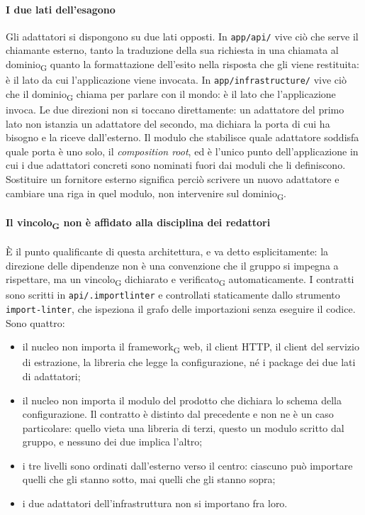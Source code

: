 \documentclass[a4paper, 10pt]{article}
\begin{document}
\paragraph{I due lati dell'esagono}
Gli adattatori si dispongono su due lati opposti. In \texttt{app/api/} vive ciò che serve il chiamante esterno, tanto la traduzione della sua richiesta in una chiamata al dominio\textsubscript{G} quanto la formattazione dell'esito nella risposta che gli viene restituita: è il lato da cui l'applicazione viene invocata. In \texttt{app/infrastructure/} vive ciò che il dominio\textsubscript{G} chiama per parlare con il mondo: è il lato che l'applicazione invoca. Le due direzioni non si toccano direttamente: un adattatore del primo lato non istanzia un adattatore del secondo, ma dichiara la porta di cui ha bisogno e la riceve dall'esterno. Il modulo che stabilisce quale adattatore soddisfa quale porta è uno solo, il \textit{composition root}, ed è l'unico punto dell'applicazione in cui i due adattatori concreti sono nominati fuori dai moduli che li definiscono. Sostituire un fornitore esterno significa perciò scrivere un nuovo adattatore e cambiare una riga in quel modulo, non intervenire sul dominio\textsubscript{G}.

\paragraph{Il vincolo\textsubscript{G} non è affidato alla disciplina dei redattori}
È il punto qualificante di questa architettura, e va detto esplicitamente: la direzione delle dipendenze non è una convenzione che il gruppo si impegna a rispettare, ma un vincolo\textsubscript{G} dichiarato e verificato\textsubscript{G} automaticamente. I contratti sono scritti in \texttt{api/.importlinter} e controllati staticamente dallo strumento \texttt{import-linter}, che ispeziona il grafo delle importazioni senza eseguire il codice. Sono quattro:

\begin{itemize}
    \setlength{\itemsep}{2pt}
    \item il nucleo non importa il framework\textsubscript{G} web, il client HTTP, il client del servizio di estrazione, la libreria che legge la configurazione, né i package dei due lati di adattatori;
    \item il nucleo non importa il modulo del prodotto che dichiara lo schema della configurazione. Il contratto è distinto dal precedente e non ne è un caso particolare: quello vieta una libreria di terzi, questo un modulo scritto dal gruppo, e nessuno dei due implica l'altro;
    \item i tre livelli sono ordinati dall'esterno verso il centro: ciascuno può importare quelli che gli stanno sotto, mai quelli che gli stanno sopra;
    \item i due adattatori dell'infrastruttura non si importano fra loro.
\end{itemize}
\end{document}
